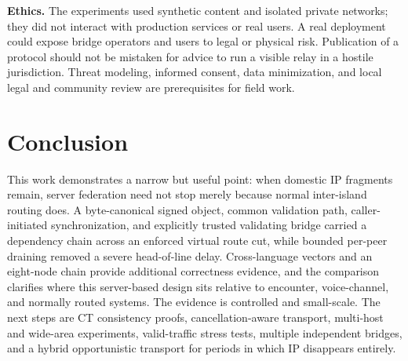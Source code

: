 \documentclass[sigconf,anonymous]{acmart}
\begin{document}
\textbf{Ethics.} The experiments used synthetic content and isolated private networks; they did not
interact with production services or real users. A real deployment could expose bridge operators and
users to legal or physical risk. Publication of a protocol should not be mistaken for advice to run a
visible relay in a hostile jurisdiction. Threat modeling, informed consent, data minimization, and
local legal and community review are prerequisites for field work.

\section{Conclusion}

This work demonstrates a narrow but useful point: when domestic IP fragments remain, server
federation need not stop merely because normal inter-island routing does. A byte-canonical signed
object, common validation path, caller-initiated synchronization, and explicitly trusted validating
bridge carried a dependency chain across an enforced virtual route cut, while bounded per-peer
draining removed a severe head-of-line delay. Cross-language vectors and an eight-node chain provide
additional correctness evidence, and the comparison clarifies where this server-based design sits
relative to encounter, voice-channel, and normally routed systems. The evidence is controlled and
small-scale. The next steps are CT consistency proofs, cancellation-aware transport, multi-host and
wide-area experiments, valid-traffic stress tests, multiple independent bridges, and a hybrid
opportunistic transport for periods in which IP disappears entirely.

\balance


\end{document}
